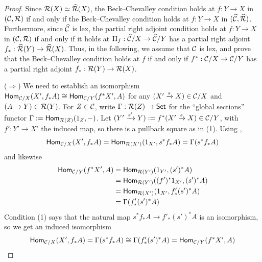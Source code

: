 \begin{proof}
  Since $\mathcal{R}(X) \simeq \widehat{\mathcal{R}}(X)$,
  the Beck--Chevalley condition holds at $f : Y \to X$
  in $(\mathcal{C},\mathcal{R})$ if and only if the Beck--Chevalley condition holds at
  $f : Y \to X$ in $(\widehat{\mathcal{C}},\widehat{\mathcal{R}})$.
  Furthermore, since $\widehat{\mathcal{C}}$ is lex,
  the partial right adjoint condition holds at $f : Y \to X$
  in $(\mathcal{C},\mathcal{R})$
  if and only if it holds at $\Pi_f : \widehat{\mathcal{C}} / X \to \widehat{\mathcal{C}} / Y$
  has a partial right adjoint $f_* : \widehat{\mathcal{R}}(Y) \to \widehat{\mathcal{R}}(X)$.
  Thus, in the following, we assume that $\mathcal{C}$ is lex,
  and prove that the Beck--Chevalley condition holds at $f$
  if and only if $f^* : \mathcal{C} / X \to \mathcal{C} / Y$
  has a partial right adjoint $f_* : \mathcal{R}(Y) \to \mathcal{R}(X)$.

  ($\Rightarrow$)
  We need to establish an isomorphism
  $\mathsf{Hom}_{\mathcal{C}/X}(X', f_* A) \cong \mathsf{Hom}_{\mathcal{C}/Y}(f^* X', A)$
  for any $(X' \xrightarrow{s} X) \in \mathcal{C}/X$ and $(A \to Y) \in \mathcal{R}(Y)$.
  For $Z \in \mathcal{C}$, write $\Gamma : \mathcal{R}(Z) \to \mathsf{Set}$
  for the ``global sections'' functor $\Gamma := \mathsf{Hom}_{\mathcal{R}(Z)}(1_Z, -)$.
  Let $(Y' \xrightarrow{s'} Y) := f^* (X' \xrightarrow{s} X) \in \mathcal{C}/Y$,
  with $f' : Y' \to X'$ the induced map,
  so there is a pullback square as in (1).
  Using ,
  \[
    \mathsf{Hom}_{\mathcal{C}/X}(X', f_* A)
    = \mathsf{Hom}_{\mathcal{R}(X')}(1_{X'}, s^* f_* A)
    = \Gamma(s^* f_* A)
  \]
  and likewise
  \begin{align*}
    \mathsf{Hom}_{\mathcal{C}/Y}(f^* X', A)
    & = \mathsf{Hom}_{\mathcal{R}(Y')}(1_{Y'}, (s')^* A) \\
    & = \mathsf{Hom}_{\mathcal{R}(Y')}((f')^* 1_{X'}, (s')^* A) \\
    & = \mathsf{Hom}_{\mathcal{R}(X')}(1_{X'}, f'_* (s')^* A) \\
    & = \Gamma(f'_* (s')^* A)
  \end{align*}
  Condition (1) says that the natural map
  $s^* f_* A \to f'_* (s')^* A$ is an isomorphism,
  so we get an induced isomorphism
  \[
    \mathsf{Hom}_{\mathcal{C}/X}(X', f_* A)
    = \Gamma(s^* f_* A)
    \cong \Gamma(f'_* (s')^* A)
    = \mathsf{Hom}_{\mathcal{C}/Y}(f^* X', A)
  \]


\end{proof}
